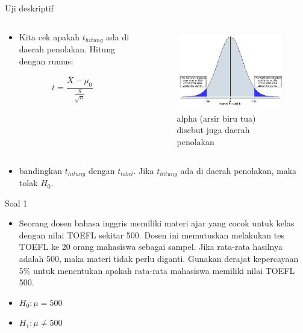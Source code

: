 \documentclass[
  ignorenonframetext,
]{beamer}
\providecommand{\tightlist}{%
  \setlength{\itemsep}{0pt}\setlength{\parskip}{0pt}}\usepackage{longtable,booktabs,array}
\begin{document}
\begin{frame}{Uji deskriptif}
\label{uji-deskriptif-1}
\begin{columns}[T]
\begin{column}{0.45\textwidth}
\begin{itemize}
\tightlist
\item
  Kita cek apakah \(t_{hitung}\) ada di daerah penolakan. Hitung dengan
  rumus:
\end{itemize}

\[
t=\frac{\bar{X}-\mu_0}{\frac{S}{\sqrt{n}}}
\]
\end{column}

\begin{column}{0.45\textwidth}
\begin{figure}[H]

{\centering \includegraphics{pvalue1.gif}

}

\caption{alpha (arsir biru tua) disebut juga daerah penolakan}

\end{figure}%
\end{column}
\end{columns}

\begin{itemize}
\tightlist
\item
  bandingkan \(t_{hitung}\) dengan \(t_{tabel}\). Jika \(t_{hitung}\)
  ada di daerah penolakan, maka tolak \(H_0\).
\end{itemize}
\end{frame}

\begin{frame}{Soal 1}
\label{soal-1}
\begin{itemize}
\item
  Seorang dosen bahasa inggris memiliki materi ajar yang cocok untuk
  kelas dengan nilai TOEFL sekitar 500. Dosen ini memutuskan melakukan
  tes TOEFL ke 20 orang mahasiswa sebagai sampel. Jika rata-rata
  hasilnya adalah 500, maka materi tidak perlu diganti. Gunakan derajat
  kepercayaan 5\% untuk menentukan apakah rata-rata mahasiswa memiliki
  nilai TOEFL 500.
\item
  \(H_0: \mu = 500\)
\item
  \(H_1: \mu \neq 500\)
\end{itemize}
\end{frame}
\end{document}
